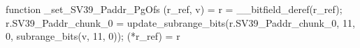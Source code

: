 function _set_SV39_Paddr_PgOfs (r_ref, v) = {
    r = __bitfield_deref(r_ref);
    r.SV39_Paddr_chunk_0 = update_subrange_bits(r.SV39_Paddr_chunk_0, 11, 0, subrange_bits(v, 11, 0));
    (*r_ref) = r
}
